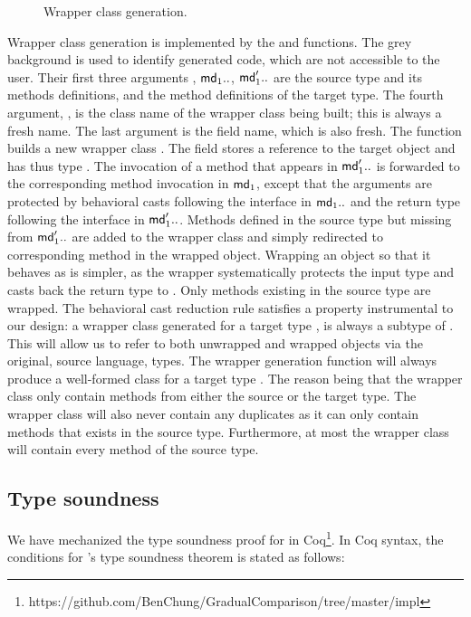 \documentclass[runnningheads]{tex/llncs}
\begin{document}
\begin{figure}[!h]
\vspace{-5mm}

\hrulefill
\vspace{-2mm}
\caption{Wrapper class generation.}\label{w}\end{figure}


Wrapper class generation is implemented by the  and 
functions. The grey background is used to identify generated code, 
which are not accessible to the user.
Their first three arguments \C, \(\md[1]..\), \(\mdp[1]..\) are
the source type and its methods definitions, and the method definitions of
the target type. The fourth argument, \D, is the class name of the wrapper
class being built; this is always a fresh name. The last argument is the
\that field name, which is also fresh.  The function builds a new wrapper
class \D.  The field \that stores a reference to the target object and has
thus type \C.  The invocation of a method that appears in $\mdp[1]..$ is
forwarded to the corresponding method invocation in $\md[1]$, except that
the arguments are protected by behavioral casts following the interface in
$\md[1]..$ and the return type following the interface in $\mdp[1]..$.
Methods defined in the source type but missing from $\mdp[1]..$ are added to
the wrapper class and simply redirected to corresponding method in the
wrapped object.  Wrapping an object so that it behaves as \any is simpler,
as the wrapper systematically protects the input type and casts back the
return type to \any. Only methods existing in the source type are
wrapped. The behavioral cast reduction rule satisfies a property
instrumental to our design: a wrapper class generated for a target type \D,
is always a subtype of \D.  This will allow us to refer to both unwrapped
and wrapped objects via the original, source language, types. The wrapper
generation function will always produce a well-formed class for a target
type \D. The reason being that the wrapper class only contain methods from
either the source or the target type. The wrapper class will also never
contain any duplicates as it can only contain methods that exists in the
source type.  Furthermore, at most the wrapper class will contain every
method of the source type.

\subsection{Type soundness} 
We have mechanized the type soundness proof for \kafka in
Coq\footnote{https://github.com/BenChung/GradualComparison/tree/master/impl}. In
Coq syntax, the conditions for \kafka's type soundness theorem is stated as
follows:
\end{document}
